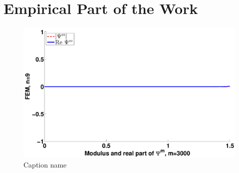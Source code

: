 \documentclass[11pt,pdf,unicode,slidestop,mathserif,notes=hide,
hyperref={colorlinks=false,bookmarksopen=true,bookmarksnumbered=true,bookmarksopenlevel=1,pdfstartview={FitH},pdfborder{0 0 0}}]{beamer}
\begin{document}

\section[Example]{Empirical Part of the Work}
\begin{frame}
\begin{center}
  \begin{figure}[ht]
   \includegraphics[width=1\linewidth]{20120309_230921_1D_EX01_SOLUTION_FEM_N=9,J=30,M=3000_k=3000_C}
   \caption{Caption name}
  \end{figure}
 \end{center}
\end{frame}
\end{document}
